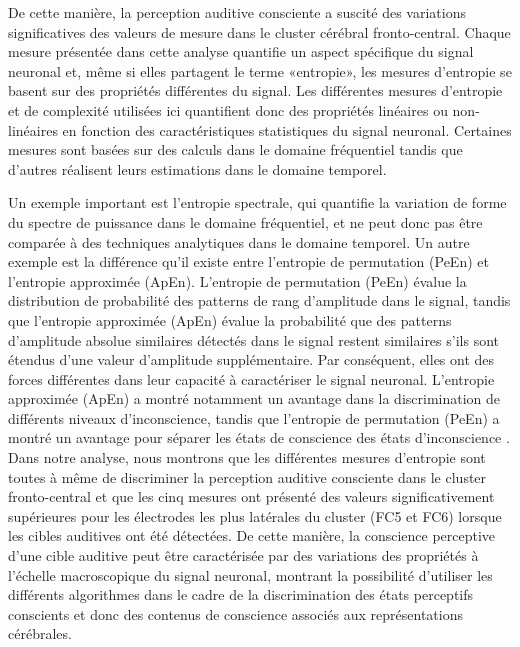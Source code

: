 De cette manière, la perception auditive consciente a suscité des variations significatives des valeurs de mesure dans le cluster cérébral fronto-central. 
Chaque mesure présentée dans cette analyse quantifie un aspect spécifique du signal neuronal et, même si elles partagent le terme «entropie», les mesures d'entropie se basent sur des propriétés différentes du signal. 
Les différentes mesures d'entropie et de complexité utilisées ici quantifient donc des propriétés linéaires ou non-linéaires en fonction des caractéristiques statistiques du signal neuronal. 
Certaines mesures sont basées sur des calculs dans le domaine fréquentiel tandis que d'autres réalisent leurs estimations dans le domaine temporel. 

Un exemple important est l'entropie spectrale, qui quantifie la variation de forme du spectre de puissance dans le domaine fréquentiel, et ne peut donc pas être comparée à des techniques analytiques dans le domaine temporel. 
Un autre exemple est la différence qu'il existe entre l'entropie de permutation (PeEn) et l'entropie approximée (ApEn). 
L'entropie de permutation (PeEn) évalue la distribution de probabilité des patterns de rang d'amplitude dans le signal, tandis que l'entropie approximée (ApEn) évalue la probabilité que des patterns d'amplitude absolue similaires détectés dans le signal restent similaires s'ils sont étendus d'une valeur d'amplitude supplémentaire. 
Par conséquent, elles ont des forces différentes dans leur capacité à caractériser le signal neuronal. 
L'entropie approximée (ApEn) a montré notamment un avantage dans la discrimination de différents niveaux d'inconscience, tandis que l'entropie de permutation (PeEn) a montré un avantage pour séparer les états de conscience des états d'inconscience \citep{schneider2014monitoring}. 
Dans notre analyse, nous montrons que les différentes mesures d'entropie sont toutes à même de discriminer la perception auditive consciente dans le cluster fronto-central et que les cinq mesures ont présenté des valeurs significativement supérieures pour les électrodes les plus latérales du cluster (FC5 et FC6) lorsque les cibles auditives ont été détectées. 
De cette manière, la conscience perceptive d'une cible auditive peut être caractérisée par des variations des propriétés à l'échelle macroscopique du signal neuronal, montrant la possibilité d'utiliser les différents algorithmes dans le cadre de la discrimination des états perceptifs conscients et donc des contenus de conscience associés aux représentations cérébrales.

